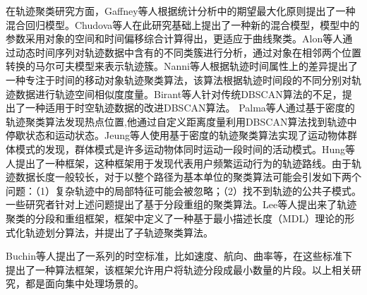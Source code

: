 在轨迹聚类研究方面，Gaffney等人根据统计分析中的期望最大化原则提出了一种混合回归模型。Chudova等人在此研究基础上提出了一种新的混合模型，模型中的参数采用对象的空间和时间偏移综合计算得出，更适应于曲线聚类。Alon等人通过动态时间序列对轨迹数据中含有的不同类簇进行分析，通过对象在相邻两个位置转换的马尔可夫模型来表示轨迹簇。Nanni等人根据轨迹时间属性上的差异提出了一种专注于时间的移动对象轨迹聚类算法，该算法根据轨迹时间段的不同分别对轨迹数据进行轨迹空间相似度度量。Birant等人针对传统DBSCAN算法的不足，提出了一种适用于时空轨迹数据的改进DBSCAN算法。
Palma等人通过基于密度的轨迹聚类算法发现热点位置,他通过自定义距离度量利用DBSCAN算法找到轨迹中停歇状态和运动状态。Jeung等人使用基于密度的轨迹聚类算法实现了运动物体群体模式的发现，群体模式是许多运动物体同时运动一段时间的活动模式。Hung等人提出了一种框架，这种框架用于发现代表用户频繁运动行为的轨迹路线。由于轨迹数据长度一般较长，对于以整个路径为基本单位的聚类算法可能会引发如下两个问题：（1）复杂轨迹中的局部特征可能会被忽略；（2）找不到轨迹的公共子模式。一些研究者针对上述问题提出了基于分段重组的聚类算法。Lee等人提出来了轨迹聚类的分段和重组框架，框架中定义了一种基于最小描述长度（MDL）理论的形式化轨迹划分算法，并提出了子轨迹聚类算法。

Buchin等人提出了一系列的时空标准，比如速度、航向、曲率等，在这些标准下提出了一种算法框架，该框架允许用户将轨迹分段成最小数量的片段。以上相关研究，都是面向集中处理场景的。

